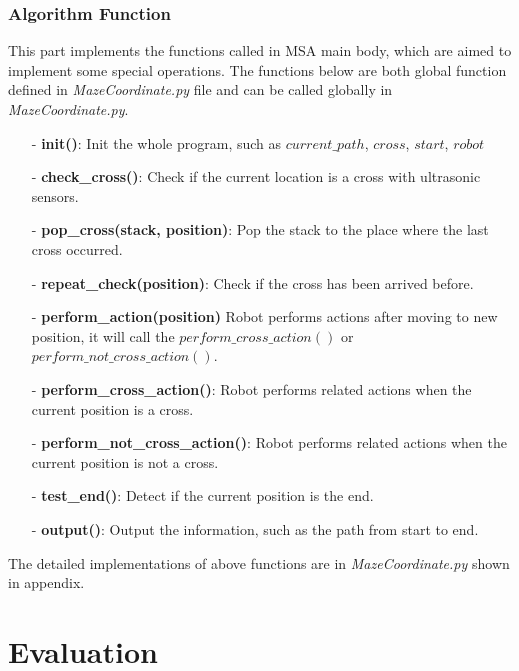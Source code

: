 \documentclass[11pt,times,oneside,openright,hardcopy]{eeereport}
\begin{document}
\subsection{Algorithm Function}
This part implements the functions called in MSA main body, which are aimed to implement some special operations.
The functions below are both global function defined in \textit{MazeCoordinate.py} file and can be called globally in \textit{MazeCoordinate.py}.
\begin{itemize}
    \item[-] \textbf{init()}: \newline Init the whole program, such as $current\_path$, $cross$, $start$, $robot$
    \item[-] \textbf{check\_cross()}: \newline Check if the current location is a cross with ultrasonic sensors.
    \item[-] \textbf{pop\_cross(stack, position)}: \newline Pop the stack to the place where the last cross occurred.
    \item[-] \textbf{repeat\_check(position)}: \newline Check if the cross has been arrived before.
    \item[-] \textbf{perform\_action(position)} \newline Robot performs actions after moving to new position, it will call the \newline $perform\_cross\_action()$ or $perform\_not\_cross\_action()$.
    \item[-] \textbf{perform\_cross\_action()}: \newline Robot performs related actions when the current position is a cross. 
    \item[-] \textbf{perform\_not\_cross\_action()}: \newline Robot performs related actions when the current position is not a cross. 
    \item[-] \textbf{test\_end()}: \newline Detect if the current position is the end.
    \item[-] \textbf{output()}: \newline Output the information, such as the path from start to end.
\end{itemize}
The detailed implementations of above functions are in \textit{MazeCoordinate.py} shown in appendix.


\chapter{Evaluation}
\end{document}
